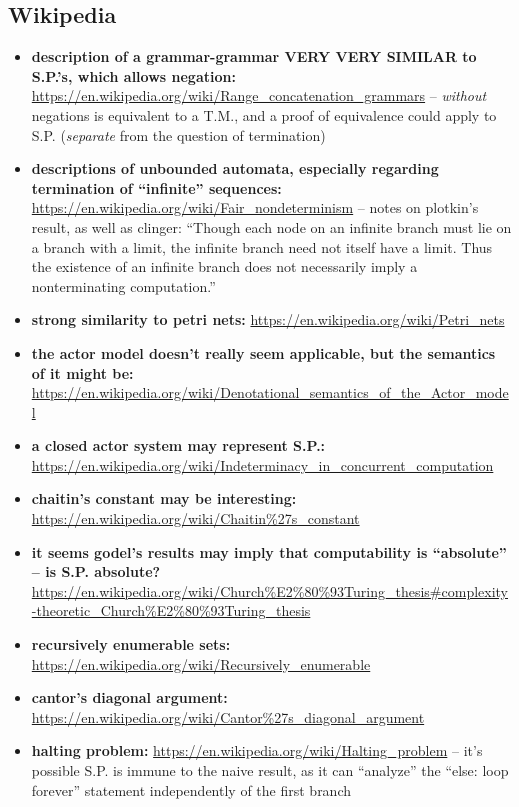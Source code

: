 \documentclass{article}
\begin{document}
\subsection{Wikipedia}
\begin{itemize}
  \item {} \label{rcg} \textbf{description of a grammar-grammar VERY VERY SIMILAR to S.P.'s, which allows negation:} \url{https://en.wikipedia.org/wiki/Range_concatenation_grammars} -- \textit{without} negations is equivalent to a T.M., and a proof of equivalence could apply to S.P. (\textit{separate} from the question of termination)
  \item \textbf{descriptions of unbounded automata, especially regarding termination of ``infinite'' sequences:} \url{https://en.wikipedia.org/wiki/Fair_nondeterminism} -- notes on plotkin's result, as well as clinger: ``Though each node on an infinite branch must lie on a branch with a limit, the infinite branch need not itself have a limit. Thus the existence of an infinite branch does not necessarily imply a nonterminating computation.''
  \item \textbf{strong similarity to petri nets:} \url{https://en.wikipedia.org/wiki/Petri\_nets}
  \item \textbf{the actor model doesn't really seem applicable, but the semantics of it might be:} \url{https://en.wikipedia.org/wiki/Denotational\_semantics\_of\_the\_Actor\_model}
  \item \textbf{a closed actor system may represent S.P.:} \url{https://en.wikipedia.org/wiki/Indeterminacy\_in\_concurrent\_computation}
  \item \textbf{chaitin's constant may be interesting:} \url{https://en.wikipedia.org/wiki/Chaitin\%27s\_constant}
  \item \textbf{it seems godel's results may imply that computability is ``absolute'' -- is S.P. absolute?} \url{https://en.wikipedia.org/wiki/Church\%E2\%80\%93Turing\_thesis\#complexity-theoretic\_Church\%E2\%80\%93Turing\_thesis}
  \item \textbf{recursively enumerable sets:} \url{https://en.wikipedia.org/wiki/Recursively\_enumerable}
  \item \textbf{cantor's diagonal argument:} \url{https://en.wikipedia.org/wiki/Cantor\%27s\_diagonal\_argument}
  \item \textbf{halting problem:} \url{https://en.wikipedia.org/wiki/Halting\_problem} -- it's possible S.P. is immune to the naive result, as it can ``analyze'' the ``else: loop forever'' statement independently of the first branch

\end{itemize}
\end{document}
